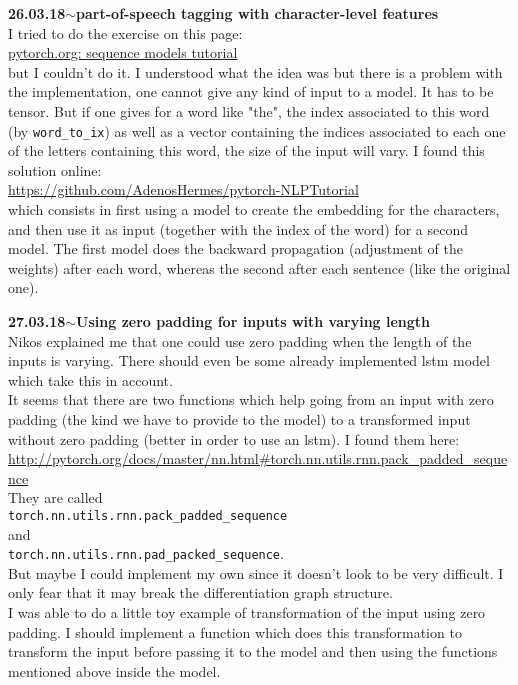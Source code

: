 \documentclass[11pt,a4paper]{article}
\newenvironment{loggentry}[2]%
{\noindent\textbf{#1}\hspace{1cm}$\mathbf{\sim}$\text{ }\textbf{#2}\\}{\vspace{0.5cm}}
\begin{document}
\begin{loggentry}{26.03.18}{part-of-speech tagging with character-level features}
I tried to do the exercise on this page:\\
\href{http://pytorch.org/tutorials/beginner/nlp/sequence_models_tutorial.html}{pytorch.org: sequence models tutorial}\\
but I couldn't do it. I understood what the idea was but there is a problem with the implementation, one cannot give any kind of input to a model. It has to be tensor. But if one gives for a word like "the", the index associated to this word (by \texttt{word\_to\_ix}) as well as a vector containing the indices associated to each one of the letters containing this word, the size of the input will vary. I found this solution online:\\
\url{https://github.com/AdenosHermes/pytorch-NLPTutorial}\\
which consists in first using a model to create the embedding for the characters, and then use it as input (together with the index of the word) for a second model. The first model does the backward propagation (adjustment of the weights) after each word, whereas the second after each sentence (like the original one).
\end{loggentry}

\begin{loggentry}{27.03.18}{Using zero padding for inputs with varying length}
Nikos explained me that one could use zero padding when the length of the inputs is varying. There should even be some already implemented lstm model which take this in account.\\
It seems that there are two functions which help going from an input with zero padding (the kind we have to provide to the model) to a transformed input without zero padding (better in order to use an lstm). I found them here:\\
\url{http://pytorch.org/docs/master/nn.html#torch.nn.utils.rnn.pack_padded_sequence}\\
They are called\\
\texttt{torch.nn.utils.rnn.pack\_padded\_sequence}\\
and\\
\texttt{torch.nn.utils.rnn.pad\_packed\_sequence}.\\
But maybe I could implement my own since it doesn't look to be very difficult. I only fear that it may break the differentiation graph structure.\\
I was able to do a little toy example of transformation of the input using zero padding. I should implement a function which does this transformation to transform the input before passing it to the model and then using the functions mentioned above inside the model.
\end{loggentry}
\end{document}
